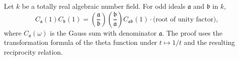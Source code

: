 Let $k$ be a totally real algebraic number field. For odd ideals $\mathfrak{a}$ and $\mathfrak{b}$ in $k$,
$$C_{\mathfrak{a}}(1) C_{\mathfrak{b}}(1) = \left(\frac{\mathfrak{a}}{\mathfrak{b}}\right) \left(\frac{\mathfrak{b}}{\mathfrak{a}}\right) C_{\mathfrak{a}\mathfrak{b}}(1) \cdot \text{(root of unity factor)},$$
where $C_{\mathfrak{a}}(\omega)$ is the Gauss sum with denominator $\mathfrak{a}$. The proof uses the transformation formula of the theta function under $t \mapsto 1/t$ and the resulting reciprocity relation.
